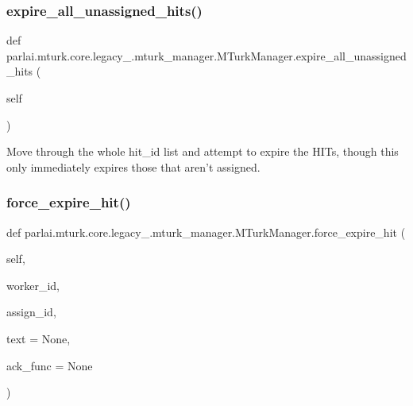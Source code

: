 \subsubsection{\texorpdfstring{expire\+\_\+all\+\_\+unassigned\+\_\+hits()}{expire\_all\_unassigned\_hits()}}
{\footnotesize\ttfamily def parlai.\+mturk.\+core.\+legacy\+\_.\+mturk\+\_\+manager.\+M\+Turk\+Manager.\+expire\+\_\+all\+\_\+unassigned\+\_\+hits (\begin{DoxyParamCaption}\item[{}]{self }\end{DoxyParamCaption})}

\begin{DoxyVerb}Move through the whole hit_id list and attempt to expire the HITs, though this
only immediately expires those that aren't assigned.
\end{DoxyVerb}
 \mbox{\label{classparlai_1_1mturk_1_1core_1_1legacy__2018_1_1mturk__manager_1_1MTurkManager_ad9c96da368b11cda593782cbbdadd940}} 
\subsubsection{\texorpdfstring{force\+\_\+expire\+\_\+hit()}{force\_expire\_hit()}}
{\footnotesize\ttfamily def parlai.\+mturk.\+core.\+legacy\+\_.\+mturk\+\_\+manager.\+M\+Turk\+Manager.\+force\+\_\+expire\+\_\+hit (\begin{DoxyParamCaption}\item[{}]{self,  }\item[{}]{worker\+\_\+id,  }\item[{}]{assign\+\_\+id,  }\item[{}]{text = {\ttfamily None},  }\item[{}]{ack\+\_\+func = {\ttfamily None} }\end{DoxyParamCaption})}

